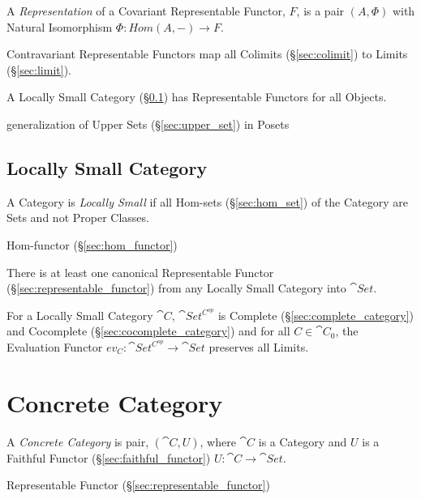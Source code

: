 A \emph{Representation} of a Covariant Representable Functor, $F$, is
a pair $(A, \Phi)$ with Natural Isomorphism $\Phi : Hom(A,-)
\rightarrow F$.

Contravariant Representable Functors map all Colimits
(\S\ref{sec:colimit}) to Limits (\S\ref{sec:limit}).

A Locally Small Category (\S\ref{sec:locally_small}) has Representable
Functors for all Objects.

generalization of Upper Sets (\S\ref{sec:upper_set}) in Posets



\subsection{Locally Small Category}\label{sec:locally_small}

A Category is \emph{Locally Small} if all Hom-sets
(\S\ref{sec:hom_set}) of the Category are Sets and not Proper Classes.

Hom-functor (\S\ref{sec:hom_functor})

There is at least one canonical Representable Functor
(\S\ref{sec:representable_functor}) from any Locally Small Category
into $\cat{Set}$.

For a Locally Small Category $\cat{C}$, $\cat{Set^{C^{op}}}$ is
Complete (\S\ref{sec:complete_category}) and Cocomplete
(\S\ref{sec:cocomplete_category}) and for all $C \in \cat{C}_0$,
the Evaluation Functor $ev_C : \cat{Set^{C^{op}}} \rightarrow
\cat{Set}$ preserves all Limits. \cite{awodey06}



\section{Concrete Category}\label{sec:concrete_category}

A \emph{Concrete Category} is pair, $(\cat{C},U)$, where $\cat{C}$ is
a Category and $U$ is a Faithful Functor
(\S\ref{sec:faithful_functor}) $U : \cat{C} \rightarrow \cat{Set}$.

Representable Functor (\S\ref{sec:representable_functor})

